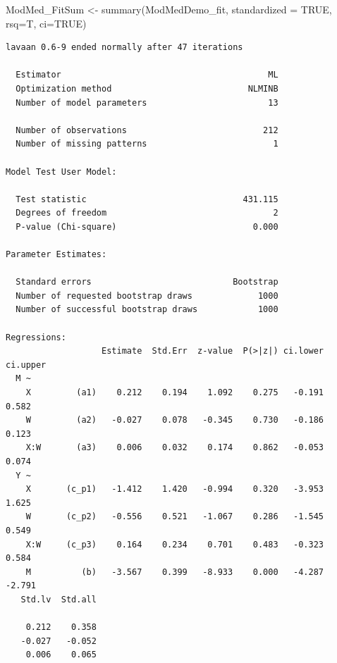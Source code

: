 \documentclass[
  11pt,
]{book}
\newenvironment{Shaded}{\begin{snugshade}}{\end{snugshade}}
\newcommand{\AttributeTok}[1]{\textcolor[rgb]{0.77,0.63,0.00}{#1}}
\newcommand{\ConstantTok}[1]{\textcolor[rgb]{0.00,0.00,0.00}{#1}}
\newcommand{\FunctionTok}[1]{\textcolor[rgb]{0.00,0.00,0.00}{#1}}
\newcommand{\NormalTok}[1]{#1}
\newcommand{\OtherTok}[1]{\textcolor[rgb]{0.56,0.35,0.01}{#1}}
\begin{document}
\begin{Shaded}
\begin{Highlighting}[]
\NormalTok{ModMed\_FitSum }\OtherTok{\textless{}{-}} \FunctionTok{summary}\NormalTok{(ModMedDemo\_fit, }\AttributeTok{standardized =} \ConstantTok{TRUE}\NormalTok{, }\AttributeTok{rsq=}\NormalTok{T, }\AttributeTok{ci=}\ConstantTok{TRUE}\NormalTok{)    }
\end{Highlighting}
\end{Shaded}

\begin{verbatim}
lavaan 0.6-9 ended normally after 47 iterations

  Estimator                                         ML
  Optimization method                           NLMINB
  Number of model parameters                        13
                                                      
  Number of observations                           212
  Number of missing patterns                         1
                                                      
Model Test User Model:
                                                      
  Test statistic                               431.115
  Degrees of freedom                                 2
  P-value (Chi-square)                           0.000

Parameter Estimates:

  Standard errors                            Bootstrap
  Number of requested bootstrap draws             1000
  Number of successful bootstrap draws            1000

Regressions:
                   Estimate  Std.Err  z-value  P(>|z|) ci.lower ci.upper
  M ~                                                                   
    X         (a1)    0.212    0.194    1.092    0.275   -0.191    0.582
    W         (a2)   -0.027    0.078   -0.345    0.730   -0.186    0.123
    X:W       (a3)    0.006    0.032    0.174    0.862   -0.053    0.074
  Y ~                                                                   
    X       (c_p1)   -1.412    1.420   -0.994    0.320   -3.953    1.625
    W       (c_p2)   -0.556    0.521   -1.067    0.286   -1.545    0.549
    X:W     (c_p3)    0.164    0.234    0.701    0.483   -0.323    0.584
    M          (b)   -3.567    0.399   -8.933    0.000   -4.287   -2.791
   Std.lv  Std.all
                  
    0.212    0.358
   -0.027   -0.052
    0.006    0.065
                  

\end{verbatim}
\end{document}
